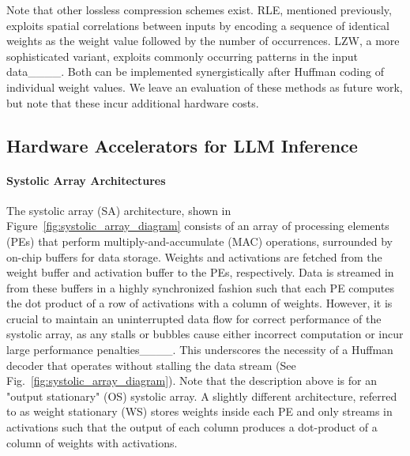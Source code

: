 Note that other lossless compression schemes exist. RLE, mentioned previously, 
exploits spatial correlations between inputs by encoding a sequence of identical
weights as the weight value followed by the number of occurrences. 
LZW, a more sophisticated variant, exploits commonly occurring patterns in the input data____. Both can be implemented synergistically after Huffman coding of individual weight values. We leave an evaluation of these methods as future work, but note that these incur additional hardware costs.

\subsection{Hardware Accelerators for LLM Inference}
\label{sec:systolic_array}
\paragraph{Systolic Array Architectures} %
The systolic array (SA) architecture, shown in Figure~\ref{fig:systolic_array_diagram} consists of an array of processing elements (PEs) that perform multiply-and-accumulate (MAC)
operations, 
surrounded by on-chip buffers for data storage. Weights and activations are fetched from the weight buffer and activation buffer to the PEs, respectively. 
Data is streamed in from these buffers in a 
highly synchronized fashion such that each PE 
computes the dot product of a row of activations with a column of weights. 
However, 
it is crucial to maintain an uninterrupted data flow for correct performance of the systolic array, as
any stalls or bubbles cause either incorrect computation or incur large performance penalties____.
This underscores the necessity of a Huffman decoder that operates without stalling the data stream (See Fig.~\ref{fig:systolic_array_diagram}). 
Note that the description above is for an "output stationary" (OS) systolic array. A slightly different architecture, referred to as weight stationary (WS) stores weights inside each PE and only streams in activations such that the output of each column produces a dot-product of a column of weights with activations. 

